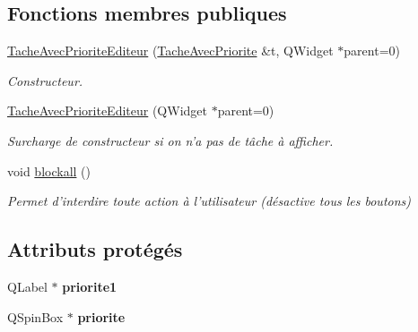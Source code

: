 \subsection*{Fonctions membres publiques}
\begin{DoxyCompactItemize}
\item 
\hyperlink{class_tache_avec_priorite_editeur_a5d207061600f11907082581cd020c82c}{Tache\-Avec\-Priorite\-Editeur} (\hyperlink{class_tache_avec_priorite}{Tache\-Avec\-Priorite} \&t, Q\-Widget $\ast$parent=0)
\begin{DoxyCompactList}\small\item\em Constructeur. \end{DoxyCompactList}\item 
\hypertarget{class_tache_avec_priorite_editeur_ace0204057380e9e2b18c0ef596170b7c}{\hyperlink{class_tache_avec_priorite_editeur_ace0204057380e9e2b18c0ef596170b7c}{Tache\-Avec\-Priorite\-Editeur} (Q\-Widget $\ast$parent=0)}\label{class_tache_avec_priorite_editeur_ace0204057380e9e2b18c0ef596170b7c}

\begin{DoxyCompactList}\small\item\em Surcharge de constructeur si on n'a pas de tâche à afficher. \end{DoxyCompactList}\item 
\hypertarget{class_tache_avec_priorite_editeur_ac9c6bc28584818776a496c2b6b9f439f}{void \hyperlink{class_tache_avec_priorite_editeur_ac9c6bc28584818776a496c2b6b9f439f}{blockall} ()}\label{class_tache_avec_priorite_editeur_ac9c6bc28584818776a496c2b6b9f439f}

\begin{DoxyCompactList}\small\item\em Permet d'interdire toute action à l'utilisateur (désactive tous les boutons) \end{DoxyCompactList}\end{DoxyCompactItemize}
\subsection*{Attributs protégés}
\begin{DoxyCompactItemize}
\item 
\hypertarget{class_tache_avec_priorite_editeur_a80548075d80a92aced5995df672c1b32}{Q\-Label $\ast$ {\bfseries priorite1}}\label{class_tache_avec_priorite_editeur_a80548075d80a92aced5995df672c1b32}

\item 
\hypertarget{class_tache_avec_priorite_editeur_a7019d322118bbbd47de8b7bec401779a}{Q\-Spin\-Box $\ast$ {\bfseries priorite}}\label{class_tache_avec_priorite_editeur_a7019d322118bbbd47de8b7bec401779a}

\end{DoxyCompactItemize}


